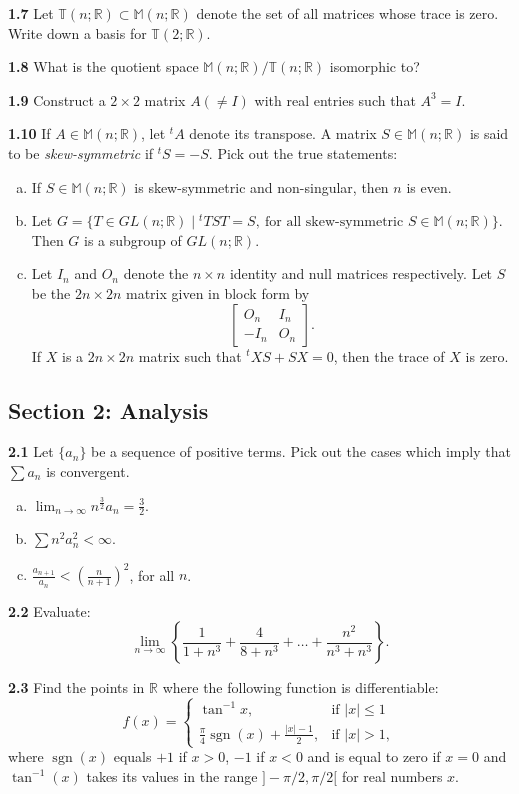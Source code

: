 \documentclass[11pt,a4paper]{article}
\newcommand{\R}{\mathbb{R}}
\newcommand{\M}{\mathbb{M}}
\newcommand{\T}{\mathbb{T}}
\newcommand{\sgn}{\operatorname{sgn}}
\newcommand{\examsec}[1]{%
  \subsection*{#1}
  \vspace{-2pt}
}
\newcommand{\qitem}[1]{\par\medskip\noindent\textbf{#1}\hspace{0.5em}}
\begin{document}
\qitem{1.7} Let $\T(n; \R) \subset \M(n; \R)$ denote the set of all matrices whose trace is zero. Write down a basis for $\T(2; \R)$.

\qitem{1.8} What is the quotient space $\M(n; \R)/\T(n; \R)$ isomorphic to?

\qitem{1.9} Construct a $2 \times 2$ matrix $A (\neq I)$ with real entries such that $A^3 = I$.

\qitem{1.10} If $A \in \M(n; \R)$, let ${}^t A$ denote its transpose. A matrix $S \in \M(n; \R)$ is said to be \emph{skew-symmetric} if ${}^t S = -S$. Pick out the true statements:
\begin{enumerate}[a.]
  \item If $S \in \M(n; \R)$ is skew-symmetric and non-singular, then $n$ is even.
  \item Let $G = \{T \in GL(n; \R) \mid {}^t T S T = S,\ \text{for all skew-symmetric } S \in \M(n; \R)\}$. Then $G$ is a subgroup of $GL(n; \R)$.
  \item Let $I_n$ and $O_n$ denote the $n \times n$ identity and null matrices respectively. Let $S$ be the $2n \times 2n$ matrix given in block form by
  \[
    \begin{bmatrix} O_n & I_n \\ -I_n & O_n \end{bmatrix}.
  \]
  If $X$ is a $2n \times 2n$ matrix such that ${}^t X S + SX = 0$, then the trace of $X$ is zero.
\end{enumerate}

\examsec{Section 2: Analysis}

\qitem{2.1} Let $\{a_n\}$ be a sequence of positive terms. Pick out the cases which imply that $\sum a_n$ is convergent.
\begin{enumerate}[a.]
  \item $\displaystyle\lim_{n \to \infty} n^{\frac{3}{2}} a_n = \frac{3}{2}$.
  \item $\displaystyle\sum n^2 a_n^2 < \infty$.
  \item $\displaystyle\frac{a_{n+1}}{a_n} < \left(\frac{n}{n+1}\right)^2$, for all $n$.
\end{enumerate}

\qitem{2.2} Evaluate:
\[
  \lim_{n \to \infty} \left\{\frac{1}{1+n^3} + \frac{4}{8+n^3} + \dots + \frac{n^2}{n^3+n^3}\right\}.
\]

\qitem{2.3} Find the points in $\R$ where the following function is differentiable:
\[
  f(x) = \begin{cases} \tan^{-1} x, & \text{if } |x| \le 1 \\ \frac{\pi}{4}\sgn(x) + \frac{|x|-1}{2}, & \text{if } |x| > 1, \end{cases}
\]
where $\sgn(x)$ equals $+1$ if $x > 0$, $-1$ if $x < 0$ and is equal to zero if $x = 0$ and $\tan^{-1}(x)$ takes its values in the range $]-\pi/2, \pi/2[$ for real numbers $x$.
\end{document}
